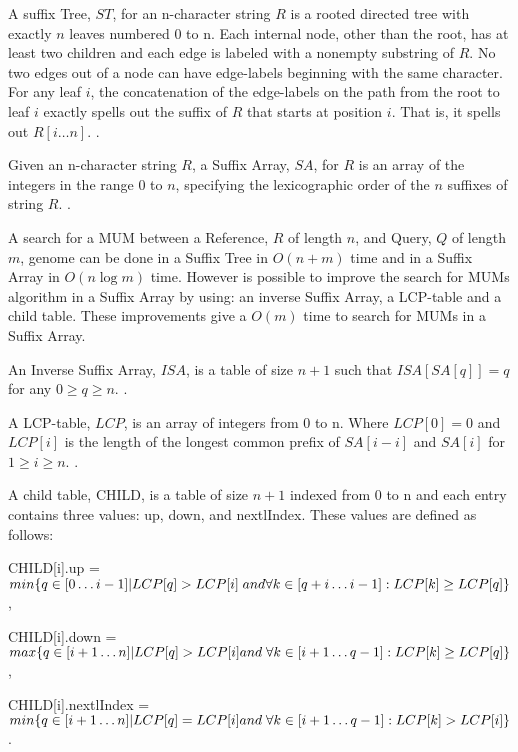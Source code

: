 \documentclass{acm_proc_article-sp}
\begin{document}
\begin{definition}
A suffix Tree, $ST$, for an n-character string $R$ is a rooted directed tree with exactly $n$ leaves numbered 0 to n. Each internal node, other than the root, has at least two children and each edge is labeled with a nonempty substring of $R$. No two edges out of a node can have edge-labels beginning with the same character. For any leaf $i$, the concatenation of the edge-labels on the path from the root to leaf $i$ exactly spells out the suffix of $R$ that starts at position $i$. That is, it spells out $R[i\ldots n]$. \cite{Gusfield1997}.
\end{definition}
\begin{definition}
Given an n-character string $R$, a Suffix Array, $SA$, for $R$ is an array of the integers in the range 0 to $n$, specifying the lexicographic order of the $n$ suffixes of string $R$. \cite{Gusfield1997}.
\end{definition}
A search for a MUM between a Reference, $R$ of length $n$, and Query, $Q$ of length $m$, genome can be done in a Suffix Tree in $O(n+m)$ time and in a Suffix Array in $O(n\log m)$ time. However is possible to improve the search for MUMs algorithm in a Suffix Array by using: an inverse Suffix Array, a LCP-table and a child table. These improvements give a $O(m)$ time \cite{Abouelhoda2004} to search for MUMs in a Suffix Array.
\begin{definition}
An Inverse Suffix Array, $ISA$, is a table of size $n+1$ such that $ISA[SA[q]]=q$ for any $0\geq q\geq n$. \cite{Abouelhoda2004}.
\end{definition}
\begin{definition}
A LCP-table, $LCP$, is an array of integers from 0 to n. Where $LCP[0]=0$ and $LCP[i]$ is the length of the longest common prefix of $SA[i-i]$ and $SA[i]$ for $1\geq i \geq n$. \cite{Abouelhoda2004}.
\end{definition}
\begin{definition}
A child table, CHILD, is a table of size $n+1$ indexed from 0 to n and each entry contains three values: up, down, and nextlIndex. These values are defined as follows: 

CHILD[i].up = $min\{q\in [0\ldots i-1]|LCP[q]>LCP[i]\;and\;\\
\forall k\in[q+i\ldots i-1]:LCP[k]\geq LCP[q]\}$,

CHILD[i].down = $max\{q\in[i+1\ldots n]|LCP[q]>LCP[i]\\
and\;\forall k\in[i+1\ldots q-1]:LCP[k]\geq LCP[q]\}$,

CHILD[i].nextlIndex = $min\{q\in[i+1\ldots n]|LCP[q]=LCP[i]\\
and\;\forall k\in[i+1\ldots q-1]:LCP[k]>LCP[i]\}$.
\end{definition}
\end{document}

